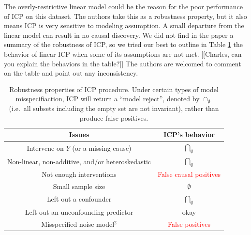 \documentclass{article}
\begin{document}
The overly-restrictive linear model could be the reason for the poor
performance of ICP on this dataset. The authors take this as a
robustness property, but it also means ICP is very sensitive to
modeling assumption. A small departure from the linear
model can result in no causal discovery. We did not find in the paper a
summary of the robustness of ICP, so we tried our best to outline in
Table \ref{tab:icp} the behavior of linear ICP when some of its
assumptions are not met. [[Charles, can you explain the
{\color{red} behaviors} in the table?]] The authors are welcomed to
comment on the table and point out any inconsistency.

\begin{table}[h]
\centering
  \begin{tabular}{|c|c|}
    \hline
    \textbf{Issues} & \textbf{ICP's behavior} \\
    \hline
    Intervene on $Y$ (or a missing cause) &
    $\underset{\emptyset}{\bigcap}$ \\
    \hline
    Non-linear, non-additive, and/or heteroskedastic &
    $\underset{\emptyset}{\bigcap}$ \\
    \hline
    Not enough interventions &
    \textcolor{red}{False causal positives} \\
    \hline
    Small sample size &
    $\emptyset$ \\
    \hline
    Left out a confounder & $\underset{\emptyset}{\bigcap}$ \\
    \hline
    Left out an unconfounding predictor & okay  \\
    \hline
    Misspecified noise model$^2$ & \textcolor{red}{False positives}\\\hline
  \end{tabular}
\caption{Robustness properties of ICP procedure.  Under certain types
  of model misspecifiaction, ICP will return a ``model reject'',
  denoted by $\cap_{\emptyset}$ (i.e.\ all subsets including the empty
  set are not invariant), rather than produce false positives.}
\label{tab:icp}
\end{table}



\end{document}
